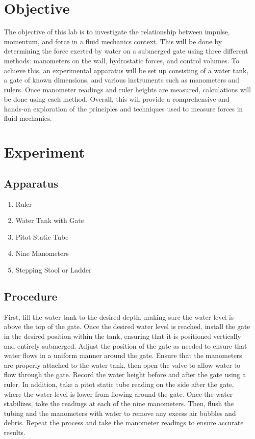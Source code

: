 \documentclass{article}
\begin{document}

\newpage
\doublespacing
\tableofcontents
\newpage
{}
\listoftables
{}
\listoffigures
\newpage
\section{Objective} 
\par The objective of this lab is to investigate the relationship between impulse, momentum, and force in a fluid mechanics context. This will be done by determining the force exerted by water on a submerged gate using three different methods: manometers on the wall, hydrostatic forces, and control volumes. To achieve this, an experimental apparatus will be set up consisting of a water tank, a gate of known dimensions, and various instruments such as manometers and rulers. Once manometer readings and ruler heights are measured, calculations will be done using each method. Overall, this will provide a comprehensive and hands-on exploration of the principles and techniques used to measure forces in fluid mechanics.
\newpage
\section{Experiment}
\subsection{Apparatus}
\begin{enumerate}
    \item Ruler 
    \item Water Tank with Gate
    \item Pitot Static Tube
    \item Nine Manometers
    \item Stepping Stool or Ladder
\end{enumerate}
\subsection{Procedure}
\par First, fill the water tank to the desired depth, making sure the water level is above the top of the gate. Once the desired water level is reached, install the gate in the desired position within the tank, ensuring that it is positioned vertically and entirely submerged. Adjust the position of the gate as needed to ensure that water flows in a uniform manner around the gate. Ensure that the manometers are properly attached to the water tank, then open the valve to allow water to flow through the gate. Record the water height before and after the gate using a ruler. In addition, take a pitot static tube reading on the side after the gate, where the water level is lower from flowing around the gate. Once the water stabilizes, take the readings at each of the nine manometers. Then, flush the tubing and the manometers with water to remove any excess air bubbles and debris. Repeat the process and take the manometer readings to ensure accurate results.
\end{document}
